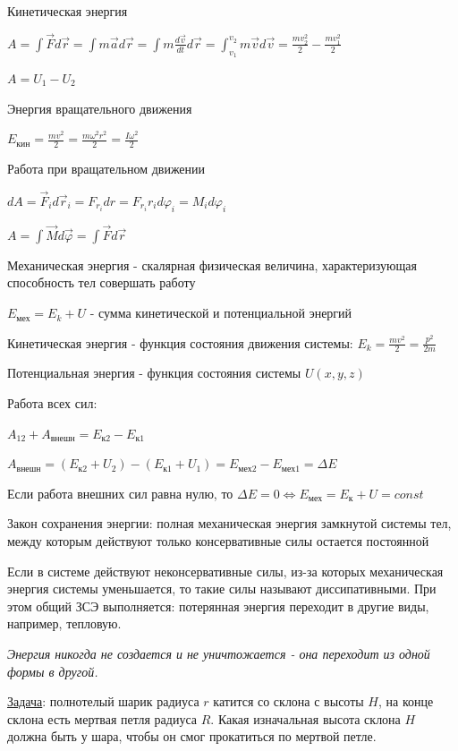 \documentclass[12pt]{article}
\begin{document}
    Кинетическая энергия
    
    $A = \int \vec{F}d\vec{r} = \int m \vec{a} d\vec{r} = \int m \frac{d\vec{v}}{dt} d\vec{r} = \int_{v_1}^{v_2} m \vec{v} d\vec{v} = \frac{mv_2^2}{2} - \frac{mv_1^2}{2}$

    $A = U_1 - U_2$

    Энергия вращательного движения

    $E_\text{кин} = \frac{mv^2}{2} = \frac{m\omega^2 r^2}{2} = \frac{I\omega^2}{2}$

    Работа при вращательном движении

    $dA = \vec{F}_i d\vec{r}_i = F_{r_i} dr = F_{r_i} r_i d\varphi_i = M_i d\varphi_i$

    $A = \int \vec{M}d\vec{\varphi} = \int \vec{F}d\vec{r}$

    Механическая энергия - скалярная физическая величина, характеризующая способность тел совершать работу

    $E_\text{мех} = E_k + U$ - сумма кинетической и потенциальной энергий

    Кинетическая энергия - функция состояния движения системы: $E_k = \frac{mv^2}{2} = \frac{p^2}{2m}$

    Потенциальная энергия - функция состояния системы $U(x, y, z)$

    Работа всех сил:

    $A_{12} + A_\text{внешн} = E_{\text{к}2} - E_{\text{к}1}$

    $A_\text{внешн} = (E_{\text{к}2} + U_2) - (E_{\text{к}1} + U_1) = E_\text{мех2} - E_\text{мех1} = \Delta E$

    Если работа внешних сил равна нулю, то $\Delta E = 0 \Longleftrightarrow E_\text{мех} = E_\text{к} + U = const$ 
    
    Закон сохранения энергии: полная механическая энергия замкнутой системы тел, между которым действуют только консервативные силы остается постоянной

    Если в системе действуют неконсервативные силы, из-за которых механическая энергия системы уменьшается, то такие силы называют диссипативными. 
    При этом общий ЗСЭ выполняется: потерянная энергия переходит в другие виды, например, тепловую.

    \textit{Энергия никогда не создается и не уничтожается - она переходит из одной формы в другой.}

    \mediumvspace

    \underline{Задача}: полнотелый шарик радиуса $r$ катится со склона с высоты $H$, на конце склона есть мертвая петля радиуса $R$.
    Какая изначальная высота склона $H$ должна быть у шара, чтобы он смог прокатиться по мертвой петле.
\end{document}

